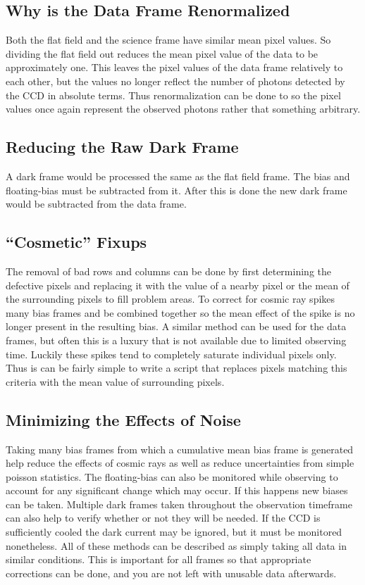 \documentclass{article}
\begin{document}
\subsection{Why is the Data Frame Renormalized}
Both the flat field and the science frame have similar mean pixel
values. So dividing the flat field out reduces the mean pixel value of the
data to be approximately one. This leaves the pixel values of the data frame relatively to each other, but the values no longer reflect the number of photons detected by the CCD in absolute terms. Thus renormalization can be done to so the pixel values once again represent the observed photons rather that something arbitrary.\\

\subsection{Reducing the Raw Dark Frame}
A dark frame would be processed the same as the flat field frame. The bias and floating-bias must be subtracted from it. After this is done the new dark frame would be subtracted from the data frame.\\

\subsection{``Cosmetic'' Fixups}
The removal of bad rows and columns can be done by first determining the defective pixels and replacing it with the value of a nearby pixel or the mean of the surrounding pixels to fill problem areas. To correct for cosmic ray spikes many bias frames and be combined together so the mean effect of the spike is no longer present in the resulting bias. A similar method can be used for the data frames, but often this is a luxury that is not available due to limited observing time. Luckily these spikes tend to completely saturate individual pixels only. Thus is can be fairly simple to write a script that replaces pixels matching this criteria with the mean value of surrounding pixels.\\

\subsection{Minimizing the Effects of Noise}
Taking many bias frames from which a cumulative mean bias frame is generated help reduce the effects of cosmic rays as well as reduce uncertainties from simple poisson statistics. The floating-bias can also be monitored while observing to account for any significant change which may occur. If this happens new biases can be taken. Multiple dark frames taken throughout the observation timeframe can also help to verify whether or not they will be needed. If the CCD is sufficiently cooled the dark current may be ignored, but it must be monitored nonetheless. All of these methods can be described as simply taking all data in similar conditions. This is important for all frames so that appropriate corrections can be done, and you are not left with unusable data afterwards.\\
\end{document}
